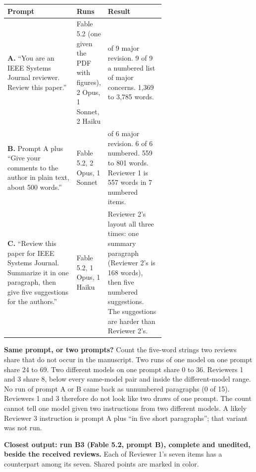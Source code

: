 \documentclass[11pt,letterpaper]{article}
\newcommand{\q}[1]{``#1''}
\begin{document}
\vspace{3pt}
{\fontsize{8.2}{9.8}\selectfont\renewcommand{\arraystretch}{1.12}
\begin{tabularx}{\linewidth}{@{}>{\RaggedRight\arraybackslash}p{0.44\linewidth}>{\RaggedRight\arraybackslash}p{0.19\linewidth}>{\RaggedRight\arraybackslash}X@{}}
\toprule
\textbf{Prompt} & \textbf{Runs} & \textbf{Result} \\
\midrule
\textbf{A.} \q{You are an IEEE Systems Journal reviewer. Review this paper.} & 4 Fable 5.2 (one given the PDF with figures), 2 Opus, 1 Sonnet, 2 Haiku & 9 of 9 major revision. 9 of 9 a numbered list of major concerns. 1,369 to 3,785 words. \\
\textbf{B.} Prompt A plus \q{Give your comments to the author in plain text, about 500 words.} & 3 Fable 5.2, 2 Opus, 1 Sonnet & 6 of 6 major revision. 6 of 6 numbered. 559 to 801 words. Reviewer 1 is 557 words in 7 numbered items. \\
\textbf{C.} \q{Review this paper for IEEE Systems Journal. Summarize it in one paragraph, then give five suggestions for the authors.} & 1 Fable 5.2, 1 Opus, 1 Haiku & Reviewer 2's layout all three times: one summary paragraph (Reviewer 2's is 168 words), then five numbered suggestions. The suggestions are harder than Reviewer 2's. \\
\bottomrule
\end{tabularx}}

\vspace{4pt}
{\fontsize{9}{10.8}\selectfont\textbf{Same prompt, or two prompts?} Count the five-word strings two reviews share that do not occur in the manuscript. Two runs of one model on one prompt share 24 to 69. Two different models on one prompt share 0 to 36. Reviewers 1 and 3 share 8, below every same-model pair and inside the different-model range. No run of prompt A or B came back as unnumbered paragraphs (0 of 15). Reviewers 1 and 3 therefore do not look like two draws of one prompt. The count cannot tell one model given two instructions from two different models. A likely Reviewer 3 instruction is prompt A plus \q{in five short paragraphs}; that variant was not run.\par}

\vspace{5pt}
{\fontsize{9}{10.8}\selectfont\textbf{Closest output: run B3 (Fable 5.2, prompt B), complete and unedited, beside the received reviews.} Each of Reviewer 1's seven items has a counterpart among its seven. Shared points are marked in color.\par}
\vspace{2pt}
\end{document}
